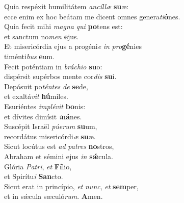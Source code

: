 \oddverse Quia respéxit humilitátem \textit{an}\textit{cíl}\textit{læ} \textbf{su}æ:~\*\\
\oddverse ecce enim ex hoc beátam me dicent omnes genera\textit{ti}\textbf{ó}nes.\\
\evenverse Quia fecit mihi \textit{ma}\textit{gna} \textit{qui} \textbf{po}tens est:~\*\\
\evenverse et sanctum no\textit{men} \textbf{e}jus.\\
\oddverse Et misericórdia ejus a progéni\textit{e} \textit{in} \textit{pro}\textbf{gé}nies~\*\\
\oddverse timénti\textit{bus} \textbf{e}um.\\
\evenverse Fecit poténtiam in \textit{brá}\textit{chi}\textit{o} \textbf{su}o:~\*\\
\evenverse dispérsit supérbos mente cor\textit{dis} \textbf{su}i.\\
\oddverse Depósuit po\textit{tén}\textit{tes} \textit{de} \textbf{se}de,~\*\\
\oddverse et exaltá\textit{vit} \textbf{hú}miles.\\
\evenverse Esuriéntes \textit{im}\textit{plé}\textit{vit} \textbf{bo}nis:~\*\\
\evenverse et dívites dimísit \textit{i}\textbf{ná}nes.\\
\oddverse Suscépit Israël \textit{pú}\textit{e}\textit{rum} \textbf{su}um,~\*\\
\oddverse recordátus misericórdi\textit{æ} \textbf{su}æ.\\
\evenverse Sicut locútus est \textit{ad} \textit{pa}\textit{tres} \textbf{no}stros,~\*\\
\evenverse Abraham et sémini ejus \textit{in} \textbf{sǽ}cula.\\
\oddverse Glória \textit{Pa}\textit{tri}, \textit{et} \textbf{Fí}lio,~\*\\
\oddverse et Spirítu\textit{i} \textbf{San}cto.\\
\evenverse Sicut erat in princípio, \textit{et} \textit{nunc}, \textit{et} \textbf{sem}per,~\*\\
\evenverse et in sǽcula sæculó\textit{rum}. \textbf{A}men.\\
